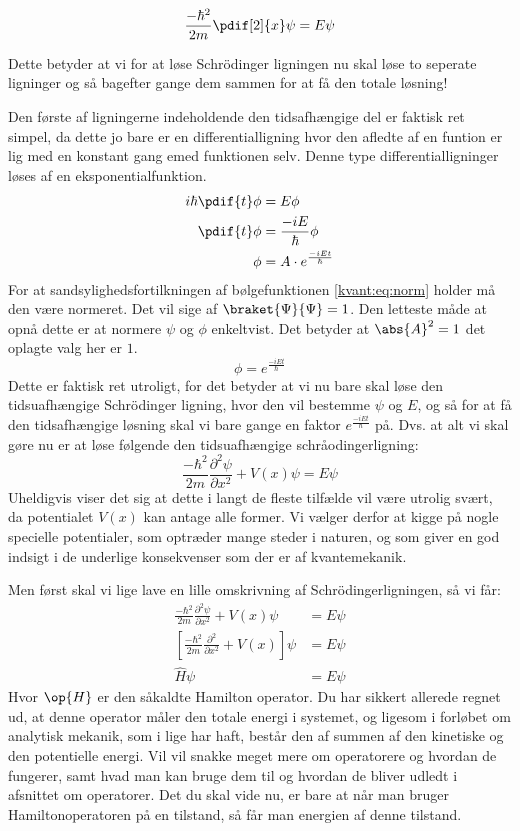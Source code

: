\begin{equation}
\frac{-\hbar^2}{2m}\pdif[2]{x}\psi = E\psi
\end{equation}


Dette betyder at vi for at løse Schrödinger ligningen nu skal løse to seperate ligninger og så bagefter gange dem sammen for at få den totale løsning!

Den første af ligningerne indeholdende den tidsafhængige del er faktisk ret simpel, da dette jo bare er en differentialligning hvor den afledte af en funtion er lig med en konstant gang emed funktionen selv. Denne type differentialligninger løses af en eksponentialfunktion.
\begin{align}
    i\hbar\pdif{t}\phi&=E\phi\nonumber\\
    \pdif{t}\phi &=\frac{-iE}{\hbar}\phi\nonumber\\
    \phi&=A\cdot e^{\frac{-iEt}{\hbar}}
\end{align}
For at sandsylighedsfortilkningen af bølgefunktionen \eqref{kvant:eq:norm} holder må den være normeret. Det vil sige af $\braket{\Psi}{\Psi}=1$. Den letteste måde at opnå dette er at normere $\psi$ og $\phi$ enkeltvist. Det betyder at $\abs{A}^2=1$ det oplagte valg her er $1$.
\begin{equation}
    \phi=e^{\frac{-iEt}{\hbar}}
\end{equation}
Dette er faktisk ret utroligt, for det betyder at vi nu bare skal løse den tidsuafhængige Schrödinger ligning, hvor den vil bestemme $\psi$ og $E$, og så for at få den tidsafhængige løsning skal vi bare gange en faktor $e^{\frac{-iEt}{\hbar}}$ på.
Dvs. at alt vi skal gøre nu er at løse følgende den tidsuafhængige schråodingerligning:
\begin{equation*}
    \frac{-\hbar^{2}}{2m}\frac{\partial^2\psi}{\partial x^2}+V(x)\psi=E\psi
\end{equation*}
Uheldigvis viser det sig at dette i langt de fleste tilfælde vil være utrolig svært, da potentialet $V(x)$ kan antage alle former. Vi vælger derfor at kigge på nogle specielle potentialer, som optræder mange steder i naturen, og som giver en god indsigt i de underlige konsekvenser som der er af kvantemekanik.

Men først skal vi lige lave en lille omskrivning af Schrödingerligningen, så vi får:
\begin{align}
    \frac{-\hbar^{2}}{2m}\frac{\partial^2\psi}{\partial x^2}+V(x)\psi&=E\psi\nonumber\\
    \left[\frac{-\hbar^{2}}{2m}\frac{\partial^2}{\partial x^2}+V(x)\right]\psi&=E\psi\nonumber\\
    \hat{H}\psi&=E\psi
\end{align}
Hvor $\op{H}$ er den såkaldte Hamilton operator. Du har sikkert allerede regnet ud, at denne operator måler den totale energi i systemet, og ligesom i forløbet om analytisk mekanik, som i lige har haft, består den af summen af den kinetiske og den potentielle energi. Vil vil snakke meget mere om operatorere og hvordan de fungerer, samt hvad man kan bruge dem til og hvordan de bliver udledt i afsnittet om operatorer. Det du skal vide nu, er bare at når man bruger Hamiltonoperatoren på en tilstand, så får man energien af denne tilstand.
